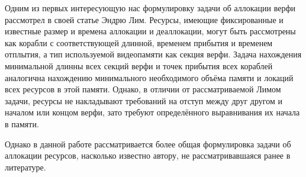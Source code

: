 Одним из первых интересующую нас формулировку задачи об аллокации верфи рассмотрел в своей статье Эндрю Лим\cite{LIM1998105}. Ресурсы, имеющие фиксированные и известные размер и времена аллокации и деаллокации, могут быть рассмотрены как корабли с соответствующей длинной, временем прибытия и временем отплытия, а тип используемой видеопамяти как секция верфи. Задача нахождения минимальной длинны всех секций верфи и точек прибытия всех кораблей аналогична нахождению минимального необходимого объёма памяти и локаций всех ресурсов в этой памяти. Однако, в отличии от рассматриваемой Лимом задачи, ресурсы не накладывают требований на отступ между друг другом и началом или концом верфи, зато требуют определённого выравнивания их начала в памяти. 

Однако в данной работе рассматривается более общая формулировка задачи об аллокации ресурсов, насколько известно автору, не рассматривавшаяся ранее в литературе.


